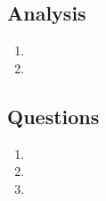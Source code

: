 \documentclass{article}
\begin{document}
\subsection{Analysis}

\begin{enumerate}
	\item
	\item
\end{enumerate}

\subsection{Questions}

\begin{enumerate}
	\item 
	\item 
	\item 
\end{enumerate}

\end{document}
